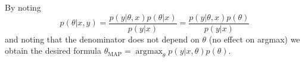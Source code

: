 \begin{answer}
By noting
$$p(\theta | x,y ) = \frac{p(y| \theta, x)p(\theta | x)}{p(y|x)} = \frac{p(y| \theta, x)p(\theta )}{p(y|x)}$$
and noting that the denominator does not depend on $\theta$ (no effect on argmax) we obtain
the desired formula
$\theta_{\text{MAP}} =
\operatorname*{argmax}_\theta p(y|x, \theta) p(\theta).$

\end{answer}
